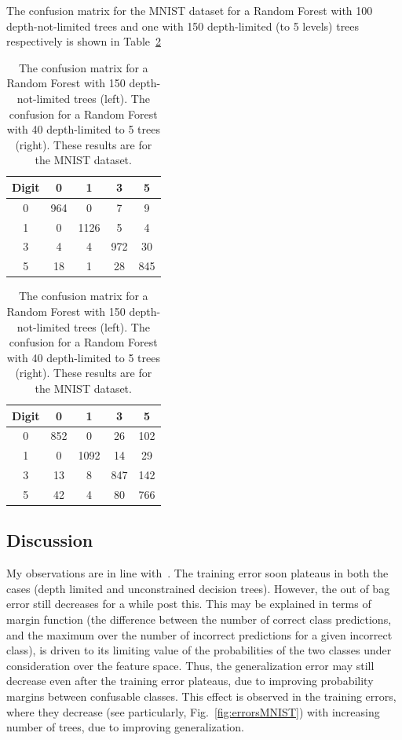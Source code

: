 \documentclass[5pt]{article}
\begin{document}
The confusion matrix for the MNIST dataset for a Random Forest with 100
depth-not-limited trees and one with 150 depth-limited (to 5 levels) trees
respectively is shown
in Table~\ref{tab:confusionMNIST}
\begin{table}
\centering
\begin{tabular}{ccccc}
\toprule
Digit & 0 & 1 & 3 & 5 \\
\midrule
0 & 964 & 0 & 7 & 9\\
1 & 0 & 1126 & 5 & 4\\
3 & 4 & 4 & 972 & 30\\
5 & 18 & 1 & 28 & 845\\
\bottomrule
\end{tabular}
\quad
\begin{tabular}{ccccc}
\toprule
Digit & 0 & 1 & 3 & 5\\
\midrule
0 & 852 & 0 & 26 & 102\\
1 & 0  & 1092 &  14 & 29\\
3 & 13 & 8 & 847 & 142\\
5 & 42 & 4 & 80 & 766\\
\bottomrule
\end{tabular}
\caption{The confusion matrix for a Random Forest with 150 depth-not-limited
  trees (left). The confusion for a Random Forest with 40 depth-limited to 5
trees (right). These results are for the MNIST dataset.}
\label{tab:confusionMNIST}
\end{table}

\subsection{Discussion}
My observations are in line with~\cite{breiman2001random}. The training error
soon plateaus in both the cases (depth limited and unconstrained decision
trees). However, the out of bag error still decreases for a while post this.
This may be explained in terms of margin function (the difference between the
number of correct class predictions, and the maximum over the number of incorrect
predictions for a given incorrect class), is driven to its limiting value of the
probabilities of the two classes under consideration over the feature space.
Thus, the generalization error may still decrease even after the training error
plateaus, due to improving probability margins between confusable classes. This
effect is observed in the training errors, where they decrease (see
particularly, Fig.~\ref{fig:errorsMNIST}) with increasing number of trees, due
to improving generalization.
\end{document}
